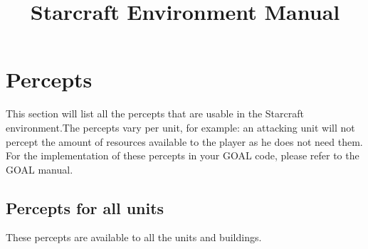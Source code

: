 \documentclass[english,11pt]{report}
\title{Starcraft Environment Manual}
\begin{document}
\maketitle
\tableofcontents

\chapter{Percepts}

This section will list all the percepts that are usable in the Starcraft environment.The percepts vary per unit, for example: an attacking unit will not percept the amount of resources available to the player as he does not need them. For the implementation of these percepts in your GOAL code, please refer to the GOAL manual.

\newpage
\section{Percepts for all units}
These percepts are available to all the units and buildings.
\end{document}
